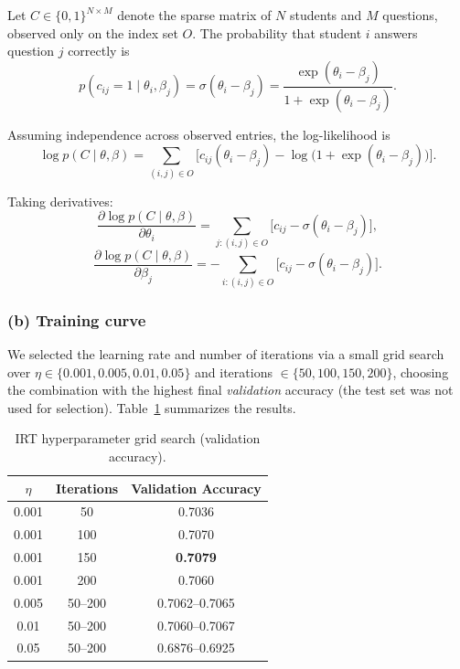 \documentclass[11pt, letterpaper]{article}
\begin{document}
Let $C \in \{0,1\}^{N \times M}$ denote the sparse matrix of $N$ students and $M$ questions, observed only on the index set $O$. The probability that student $i$ answers question $j$ correctly is
\[
p(c_{ij} = 1 \mid \theta_i, \beta_j) = \sigma(\theta_i - \beta_j) = \frac{\exp(\theta_i - \beta_j)}{1 + \exp(\theta_i - \beta_j)}.
\]
 
Assuming independence across observed entries, the log-likelihood is
\[
\log p(C \mid \theta, \beta) = \sum_{(i,j) \in O} \Big[ c_{ij}(\theta_i - \beta_j) - \log\big(1 + \exp(\theta_i - \beta_j)\big) \Big].
\]
 
Taking derivatives:
\[
\frac{\partial \log p(C\mid\theta,\beta)}{\partial \theta_i} = \sum_{j : (i,j) \in O} \Big[ c_{ij} - \sigma(\theta_i - \beta_j) \Big],
\]
\[
\frac{\partial \log p(C\mid\theta,\beta)}{\partial \beta_j} = -\sum_{i : (i,j) \in O} \Big[ c_{ij} - \sigma(\theta_i - \beta_j) \Big].
\]
 
\subsubsection*{(b) Training curve}
We selected the learning rate and number of iterations via a small grid search over $\eta \in \{0.001, 0.005, 0.01, 0.05\}$ and iterations $\in \{50, 100, 150, 200\}$, choosing the combination with the highest final \emph{validation} accuracy (the test set was not used for selection). Table~\ref{tab:irt_tune} summarizes the results.

\begin{table}[H]
    \centering
    \begin{tabular}{ccc}
        \toprule
        $\eta$ & Iterations & Validation Accuracy \\
        \midrule
        0.001 & 50  & 0.7036 \\
        0.001 & 100 & 0.7070 \\
        0.001 & 150 & \textbf{0.7079} \\
        0.001 & 200 & 0.7060 \\
        0.005 & 50--200 & 0.7062--0.7065 \\
        0.01  & 50--200 & 0.7060--0.7067 \\
        0.05  & 50--200 & 0.6876--0.6925 \\
        \bottomrule
    \end{tabular}
    \caption{IRT hyperparameter grid search (validation accuracy).}
    \label{tab:irt_tune}
\end{table}
\end{document}
